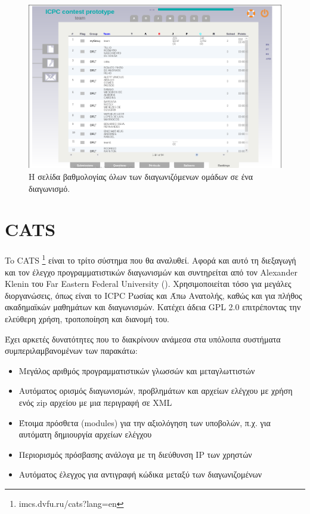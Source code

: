 \documentclass[diploma]{softlab-thesis}
\begin{document}
\begin{figure}
  \centering
  \includegraphics[scale=0.45,trim=4 4 4 4,clip]{Figures/mooshakrankings.png}
  \caption[Σελίδα βαθμολογίας Mooshak]{Η σελίδα βαθμολογίας όλων των διαγωνιζόμενων
  ομάδων σε ένα διαγωνισμό.}
\end{figure}

\FloatBarrier

\section{CATS}

To CATS \footnote{imcs.dvfu.ru/cats?lang=en} είναι το τρίτο σύστημα που θα
αναλυθεί. Αφορά και αυτό τη διεξαγωγή και τον έλεγχο προγραμματιστικών
διαγωνισμών και συντηρείται από τον Alexander Klenin του Far Eastern Federal
University (\cite{Rozhkov}). Χρησιμοποιείται τόσο για μεγάλες διοργανώσεις,
όπως είναι το ICPC Ρωσίας και Άπω Ανατολής, καθώς και για πλήθος ακαδημαϊκών
μαθημάτων και διαγωνισμών. Κατέχει άδεια GPL 2.0 επιτρέποντας την ελεύθερη
χρήση, τροποποίηση και διανομή του.

\bigskip

Έχει αρκετές δυνατότητες που το διακρίνουν ανάμεσα στα υπόλοιπα συστήματα
συμπεριλαμβανομένων των παρακάτω:

\begin{itemize}
    \item Μεγάλος αριθμός προγραμματιστικών γλωσσών και μεταγλωττιστών
    \item Αυτόματος ορισμός διαγωνισμών, προβλημάτων και αρχείων ελέγχου με χρήση
      ενός zip αρχείου με μια περιγραφή σε XML
    \item Έτοιμα πρόσθετα (modules) για την αξιολόγηση των υποβολών, π.χ. για
      αυτόματη δημιουργία αρχείων ελέγχου
    \item Περιορισμός πρόσβασης ανάλογα με τη διεύθυνση IP των χρηστών
    \item Αυτόματος έλεγχος για αντιγραφή κώδικα μεταξύ των διαγωνιζομένων
\end{itemize}
\end{document}

